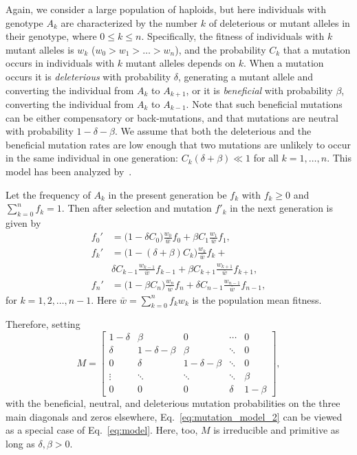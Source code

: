 \documentclass[12pt, twocolumn]{extarticle}
\begin{document}
Again, we consider a large population of haploids, but here individuals with genotype $A_k$ are characterized by the number $k$ of deleterious or mutant alleles in their genotype, where $0 \le k \le n$.
Specifically, the fitness of individuals with $k$ mutant alleles is $w_k$ ($w_0 > w_1 > \ldots > w_n$),
and the probability $C_k$ that a mutation occurs in individuals with $k$ mutant alleles depends on $k$.
When a mutation occurs it is \emph{deleterious} with probability $\delta$, generating a mutant allele and converting the individual from $A_k$ to $A_{k+1}$,
or it is \emph{beneficial} with probability $\beta$, converting the individual from $A_k$ to $A_{k-1}$.
Note that such beneficial mutations can be either compensatory or back-mutations, and that mutations are neutral with probability $1-\delta-\beta$.
We assume that both the deleterious and the beneficial mutation rates are low enough that two mutations are unlikely to occur in the same individual in one generation: $C_k(\delta + \beta) \ll 1$ for all $k=1, \ldots, n$.
This model has been analyzed by~\citet{Ram2012}.

Let the frequency of $A_k$ in the present generation be $f_k$ with $f_k \ge 0$ and $\sum_{k=0}^{n}{f_k}=1$.
Then after selection and mutation $f'_k$ in the next generation is given by
\begin{equation}
\begin{aligned}
f_0' &= \big(1 - \delta C_0\big) \frac{w_0}{\bar{w}} f_0 + \beta C_{1} \frac{w_{1}}{\bar{w}} f_{1}, \\
f_k' &= \big(1 - (\delta+\beta) C_k\big) \frac{w_k}{\bar{w}} f_k + \\
	 & \delta C_{k-1} \frac{w_{k-1}}{\bar{w}} f_{k-1} + 
	 \beta C_{k+1} \frac{w_{k+1}}{\bar{w}} f_{k+1}, \\
f_n' &= \big(1 - \beta C_n\big) \frac{w_n}{\bar{w}} f_n + \delta C_{n-1} \frac{w_{n-1}}{\bar{w}} f_{n-1},	 
\end{aligned}
\label{eq:mutation_model_2}
\end{equation}
for $k=1,2,\ldots, n-1$.
Here $\bar{w}=\sum_{k=0}^{n}{f_k w_k}$ is the population mean fitness.

Therefore, setting 
\begin{equation}
{M} = \begin{bmatrix}
1-\delta & \beta & 0 &  \cdots & 0\\
\delta & 1-\delta-\beta & \beta &  \ddots & 0\\
0 & \delta & 1-\delta-\beta & \ddots & 0 \\
\vdots & \ddots & \ddots & \ddots & \beta \\
0 & 0 & 0 & \delta & 1-\beta
\end{bmatrix},
\end{equation}
with the beneficial, neutral, and deleterious mutation probabilities on the three main diagonals and zeros elsewhere, 
Eq.~\ref{eq:mutation_model_2} can be viewed as a special case of Eq.~\ref{eq:model}.
Here, too, ${M}$ is irreducible and primitive as long as $\delta, \beta > 0$.
\end{document}
